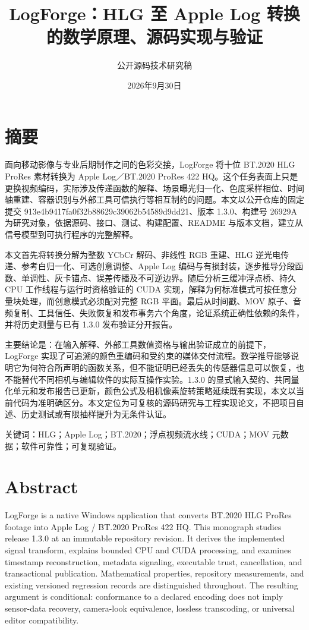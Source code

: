 \documentclass[UTF8,zihao=-4,openany]{ctexbook}
\title{LogForge：HLG 至 Apple Log 转换的数学原理、源码实现与验证}
\author{公开源码技术研究稿}\date{2026年9月30日}
\begin{document}
\maketitle\tableofcontents

\chapter*{摘要}
面向移动影像与专业后期制作之间的色彩交接，LogForge 将十位 BT.2020 HLG ProRes 素材转换为 Apple Log／BT.2020 ProRes 422 HQ。这个任务表面上只是更换视频编码，实际涉及传递函数的解释、场景曝光归一化、色度采样相位、时间轴重建、容器识别与外部工具可信执行等相互制约的问题。本文以公开仓库的固定提交 913e4b9417fa0f32b88629c39062b54589d9dd21、版本 1.3.0、构建号 26929A 为研究对象，依据源码、接口、测试、构建配置、README 与版本文档，建立从信号模型到可执行程序的完整解释。

本文首先将转换分解为整数 YCbCr 解码、非线性 RGB 重建、HLG 逆光电传递、参考白归一化、可选创意调整、Apple Log 编码与有损封装，逐步推导分段函数、单调性、灰卡锚点、误差传播及不可逆边界。随后分析三缓冲浮点桥、持久 CPU 工作线程与运行时资格验证的 CUDA 实现，解释为何标准模式可按任意分量块处理，而创意模式必须配对完整 RGB 平面。最后从时间戳、MOV 原子、音频复制、工具信任、失败恢复和发布事务六个角度，论证系统正确性依赖的条件，并将历史测量与已有 1.3.0 发布验证分开报告。

主要结论是：在输入解释、外部工具数值资格与输出验证成立的前提下，LogForge 实现了可追溯的颜色重编码和受约束的媒体交付流程。数学推导能够说明它为何符合所声明的函数关系，但不能证明已经丢失的传感器信息可以恢复，也不能替代不同相机与编辑软件的实际互操作实验。1.3.0 的显式输入契约、共同量化单元和发布报告已更新，颜色公式及相机像素旋转策略延续既有实现，本文以当前代码为准明确区分。本文定位为可复核的源码研究与工程实现论文，不把项目自述、历史测试或有限抽样提升为无条件认证。

关键词：HLG；Apple Log；BT.2020；浮点视频流水线；CUDA；MOV 元数据；软件可靠性；可复现验证。


\chapter*{Abstract}
LogForge is a native Windows application that converts BT.2020 HLG ProRes footage into Apple Log / BT.2020 ProRes 422 HQ. This monograph studies release 1.3.0 at an immutable repository revision. It derives the implemented signal transform, explains bounded CPU and CUDA processing, and examines timestamp reconstruction, metadata signaling, executable trust, cancellation, and transactional publication. Mathematical properties, repository measurements, and existing versioned regression records are distinguished throughout. The resulting argument is conditional: conformance to a declared encoding does not imply sensor-data recovery, camera-look equivalence, lossless transcoding, or universal editor compatibility.
\end{document}
